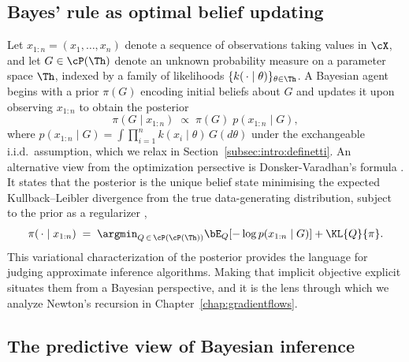 \subsection{Bayes' rule as optimal belief updating}
\label{subsec:intro:bayes}

Let $x_{1:n} = (x_1, \ldots, x_n)$ denote a sequence of observations
taking values in $\cX$, and let $G \in \cP(\Th)$ denote an unknown
probability measure on a parameter space $\Th$, indexed by a family of
likelihoods $\{k(\,\cdot\mid\theta)\}_{\theta\in\Th}$.  A Bayesian agent
begins with a prior $\pi(G)$ encoding initial beliefs about $G$ and
updates it upon observing $x_{1:n}$ to obtain the posterior
\begin{equation}
  \pi(G \mid x_{1:n})
  \;\propto\;
  \pi(G)\; p(x_{1:n} \mid G),
  \label{eq:bayes-rule}
\end{equation}
where $p(x_{1:n} \mid G) = \int \prod_{i=1}^{n} k(x_i \mid \theta)\,
G(d\theta)$ under the exchangeable i.i.d.\ assumption, which we relax in
Section~\ref{subsec:intro:definetti}.  An alternative view from the optimization persective is Donsker-Varadhan's formula \citep{donskervaradhan}. It states that the posterior is the unique belief
state minimising the expected Kullback--Leibler divergence from the true
data-generating distribution, subject to the prior as a regularizer
\citep{Zellner1988},
\begin{equation}
  \pi(\,\cdot\mid x_{1:n})
  \;=\;
  \argmin_{Q\,\in\,\cP(\cP(\Th))}
  \bE_Q\!\left[-\log p(x_{1:n}\mid G)\right]
  + \KL{Q}{\pi}.
  \label{eq:bayes-variational}
\end{equation}
This variational characterization of the posterior provides
the language for judging approximate inference algorithms. Making that
implicit objective explicit situates them from a Bayesian perspective,
and it is the lens through which we analyze Newton's recursion in
Chapter~\ref{chap:gradientflows}.

\subsection{The predictive view of Bayesian inference}
\label{subsec:intro:predictive}

